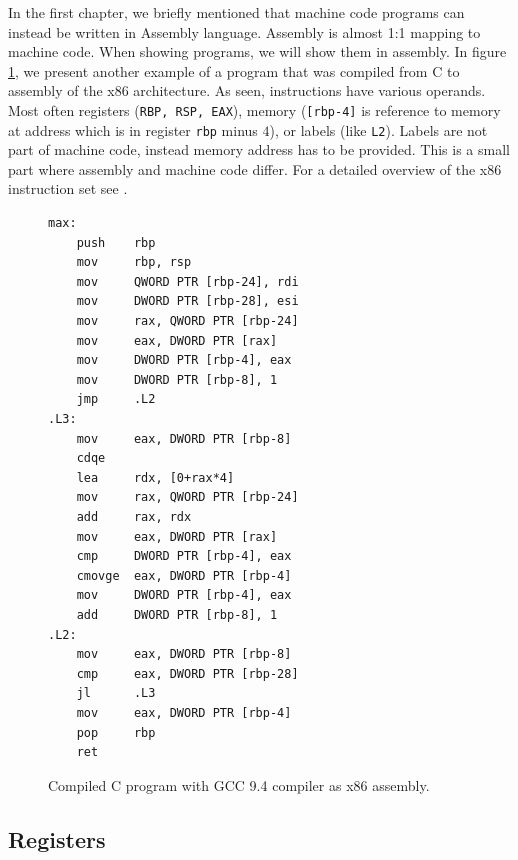 In the first chapter, we briefly mentioned that machine code programs can
instead be written in Assembly language. Assembly is almost 1:1 mapping to
machine code. When showing programs, we will show them in assembly. In figure
\ref{fig:assembly-example2}, we present another example of a program that was
compiled from C to assembly of the x86 architecture. As seen, instructions have
various operands. Most often registers (\texttt{RBP, RSP, EAX}), memory
(\texttt{[rbp-4]} is reference to memory at address which is in register
\texttt{rbp} minus $4$), or labels (like \texttt{L2}). Labels are not part of
machine code, instead memory address has to be provided. This is a small part
where assembly and machine code differ. For a detailed overview of the x86
instruction set see \cite{intel-manual}.

\begin{figure}\label{fig:assembly-example2}
    \begin{lstlisting}
max:
    push    rbp
    mov     rbp, rsp
    mov     QWORD PTR [rbp-24], rdi
    mov     DWORD PTR [rbp-28], esi
    mov     rax, QWORD PTR [rbp-24]
    mov     eax, DWORD PTR [rax]
    mov     DWORD PTR [rbp-4], eax
    mov     DWORD PTR [rbp-8], 1
    jmp     .L2
.L3:
    mov     eax, DWORD PTR [rbp-8]
    cdqe
    lea     rdx, [0+rax*4]
    mov     rax, QWORD PTR [rbp-24]
    add     rax, rdx
    mov     eax, DWORD PTR [rax]
    cmp     DWORD PTR [rbp-4], eax
    cmovge  eax, DWORD PTR [rbp-4]
    mov     DWORD PTR [rbp-4], eax
    add     DWORD PTR [rbp-8], 1
.L2:
    mov     eax, DWORD PTR [rbp-8]
    cmp     eax, DWORD PTR [rbp-28]
    jl      .L3
    mov     eax, DWORD PTR [rbp-4]
    pop     rbp
    ret
    \end{lstlisting}
    \caption{Compiled C program with GCC 9.4 compiler as x86 assembly.}
\end{figure}

\subsection{Registers}\label{subsection:registers}


